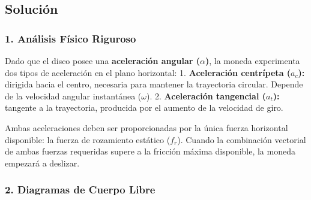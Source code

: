 \documentclass[12pt, a4paper]{article}
\begin{document}
\subsection*{Solución}

\subsubsection*{1. Análisis Físico Riguroso}
Dado que el disco posee una \textbf{aceleración angular ($\alpha$)}, la moneda experimenta dos tipos de aceleración en el plano horizontal:
1. \textbf{Aceleración centrípeta ($a_c$):} dirigida hacia el centro, necesaria para mantener la trayectoria circular. Depende de la velocidad angular instantánea ($\omega$).
2. \textbf{Aceleración tangencial ($a_t$):} tangente a la trayectoria, producida por el aumento de la velocidad de giro.

Ambas aceleraciones deben ser proporcionadas por la única fuerza horizontal disponible: la fuerza de rozamiento estático ($f_r$). Cuando la combinación vectorial de ambas fuerzas requeridas supere a la fricción máxima disponible, la moneda empezará a deslizar.

\subsubsection*{2. Diagramas de Cuerpo Libre}
\end{document}

